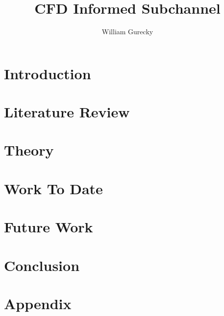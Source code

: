 \documentclass[12pt,a4paper]{report}
\author{William Gurecky}
\title{CFD Informed Subchannel}
\begin{document}




\onehalfspacing
\chapter{Introduction}
\label{chap:intro}


\chapter{Literature Review}
\label{chap:lit}


\chapter{Theory}
\label{chap:theory}


\chapter{Work To Date}
\label{chap:work}


\chapter{Future Work}
\label{chap:fw}

\chapter{Conclusion}
\label{chap:conc}






\chapter{Appendix}
\label{chap:app}

\end{document}

